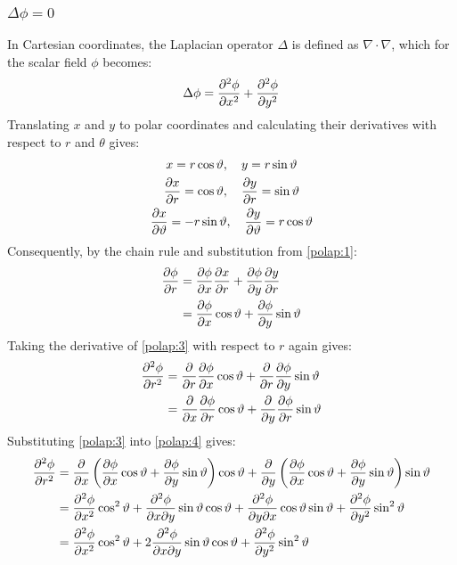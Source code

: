 \subsubsection{$\Delta\phi=0$}\label{sec:deltaphizero}
In Cartesian coordinates, the Laplacian operator $\Delta$ is defined as $\nabla\cdot\nabla$, which for the scalar field $\phi$ becomes:
\begin{gather}
	\notag\Delta\phi=\frac{\partial^2\phi}{\partial x^2}+\frac{\partial^2\phi}{\partial y^2}
\end{gather}
Translating $x$ and $y$ to polar coordinates and calculating their derivatives with respect to $r$ and $\theta$ gives:
\begin{gather}
	\notag x=r\cos\vartheta,\quad y=r\sin\vartheta\\
	\label{polap:1}\frac{\partial x}{\partial r}=\cos\vartheta,\quad\frac{\partial y}{\partial r}=\sin\vartheta\\
	\label{polap:2}\frac{\partial x}{\partial \vartheta}=-r\sin\vartheta,\quad\frac{\partial y}{\partial \vartheta}=r\cos\vartheta
\end{gather}
Consequently, by the chain rule and substitution from \ref{polap:1}:
\begin{align}
	\notag\frac{\partial \phi}{\partial r}&=\frac{\partial \phi}{\partial x}\frac{\partial x}{\partial r}+\frac{\partial \phi}{\partial y}\frac{\partial y}{\partial r}\\
	\label{polap:3}&=\frac{\partial \phi}{\partial x}\cos\vartheta+\frac{\partial \phi}{\partial y}\sin\vartheta
\end{align}
Taking the derivative of \ref{polap:3} with respect to $r$ again gives:
\begin{align}
	\notag\frac{\partial^2\phi}{\partial r^2}&=\frac{\partial }{\partial r}\frac{\partial \phi}{\partial x}\cos\vartheta+\frac{\partial }{\partial r}\frac{\partial \phi}{\partial y}\sin\vartheta\\
	\label{polap:4}&=\frac{\partial }{\partial x}\frac{\partial \phi}{\partial r}\cos\vartheta+\frac{\partial }{\partial y}\frac{\partial \phi}{\partial r}\sin\vartheta
\end{align}
Substituting \ref{polap:3} into \ref{polap:4} gives:
\begin{align}
	\notag\frac{\partial^2\phi}{\partial r^2}&=\frac{\partial }{\partial x}\left(\frac{\partial \phi}{\partial x}\cos\vartheta+\frac{\partial \phi}{\partial y}\sin\vartheta\right)\cos\vartheta+\frac{\partial }{\partial y}\left(\frac{\partial \phi}{\partial x}\cos\vartheta+\frac{\partial \phi}{\partial y}\sin\vartheta\right)\sin\vartheta\\
	\notag&=\frac{\partial^2\phi}{\partial x^2}\cos^2\vartheta+\frac{\partial^2\phi}{\partial x\partial y}\sin\vartheta\cos\vartheta+\frac{\partial^2\phi}{\partial y\partial x}\cos\vartheta\sin\vartheta+\frac{\partial^2\phi}{\partial y^2}\sin^2\vartheta\\
	\label{polap:5}&=\frac{\partial^2\phi}{\partial x^2}\cos^2\vartheta+2\frac{\partial^2\phi}{\partial x\partial y}\sin\vartheta\cos\vartheta+\frac{\partial^2\phi}{\partial y^2}\sin^2\vartheta
\end{align}
